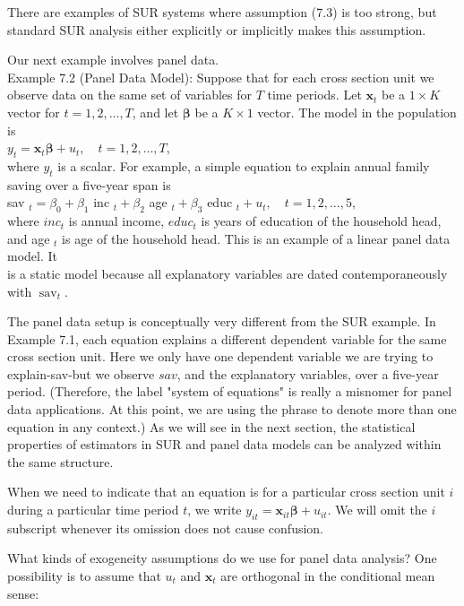 \documentclass[10pt]{article}
\begin{document}
There are examples of SUR systems where assumption (7.3) is too strong, but standard SUR analysis either explicitly or implicitly makes this assumption.

Our next example involves panel data.\\
Example 7.2 (Panel Data Model): Suppose that for each cross section unit we observe data on the same set of variables for $T$ time periods. Let $\mathbf{x}_{t}$ be a $1 \times K$ vector for $t=1,2, \ldots, T$, and let $\boldsymbol{\beta}$ be a $K \times 1$ vector. The model in the population is\\
$y_{t}=\mathbf{x}_{t} \boldsymbol{\beta}+u_{t}, \quad t=1,2, \ldots, T$,\\
where $y_{t}$ is a scalar. For example, a simple equation to explain annual family saving over a five-year span is\\
sav $_{t}=\beta_{0}+\beta_{1}$ inc $_{t}+\beta_{2}$ age $_{t}+\beta_{3}$ educ $_{t}+u_{t}, \quad t=1,2, \ldots, 5$,\\
where $i n c_{t}$ is annual income, $e d u c_{t}$ is years of education of the household head, and age $_{t}$ is age of the household head. This is an example of a linear panel data model. It\\
is a static model because all explanatory variables are dated contemporaneously with $\operatorname{sav}_{t}$.

The panel data setup is conceptually very different from the SUR example. In Example 7.1, each equation explains a different dependent variable for the same cross section unit. Here we only have one dependent variable we are trying to explain-sav-but we observe $s a v$, and the explanatory variables, over a five-year period. (Therefore, the label "system of equations" is really a misnomer for panel data applications. At this point, we are using the phrase to denote more than one equation in any context.) As we will see in the next section, the statistical properties of estimators in SUR and panel data models can be analyzed within the same structure.

When we need to indicate that an equation is for a particular cross section unit $i$ during a particular time period $t$, we write $y_{i t}=\mathbf{x}_{i t} \boldsymbol{\beta}+u_{i t}$. We will omit the $i$ subscript whenever its omission does not cause confusion.

What kinds of exogeneity assumptions do we use for panel data analysis? One possibility is to assume that $u_{t}$ and $\mathbf{x}_{t}$ are orthogonal in the conditional mean sense:
\end{document}

